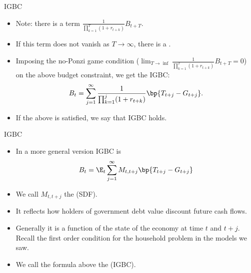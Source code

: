 \documentclass[11pt,xcolor={dvipsnames},aspectratio=159,hyperref={pdftex,pdfpagemode=UseNone,hidelinks,pdfdisplaydoctitle=true},usepdftitle=false]{beamer}
\begin{document}
\begin{frame}{IGBC}
    \begin{itemize}
        \item Note: there is a term $\frac{1}{\prod_{k=1}^T (1+r_{t+k})}  B_{t+T}$. 
        \item If this term does not vanish as $T\to\infty$, there is a .
        \item Imposing the no-Ponzi game condition ($\lim_{T\rightarrow \inf} \frac{1}{\prod_{k=1}^T (1+r_{t+k})}  B_{t+T} = 0$) on the above budget constraint, we get the IGBC: \begin{align*}
            B_t = \sum_{j=1}^\infty \frac{1}{\prod_{k=1}^j (1+r_{t+k})} \bp{T_{t+j}-G_{t+j}}.
        \end{align*}
        \item If the above is satisfied, we say that IGBC holds. 
        \end{itemize}
\end{frame}



\begin{frame}{IGBC}
    \begin{itemize}
        \item In a more general version IGBC is \begin{align*}
            B_t = \E_t \sum_{j=1}^\infty M_{t,t+j} \bp{T_{t+j}-G_{t+j}}
        \end{align*}
        \item We call $M_{t,t+j}$ the  (SDF). 
        \item It reflects how holders of government debt value discount future cash flows. 
        \item Generally it is a function of the state of the economy at time $t$ and $t+j$. Recall the first order condition for the household problem in the models we saw.
        \item We call the formula above the  (IGBC).
        \end{itemize}
\end{frame}
\end{document}
